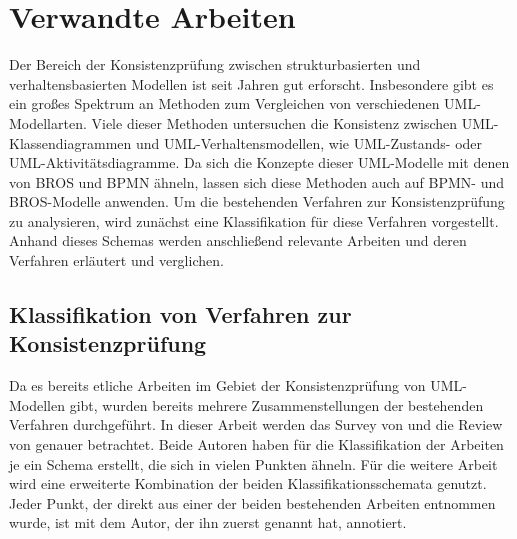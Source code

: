 \chapter{Verwandte Arbeiten}
\label{chap:related_work}

Der Bereich der Konsistenzprüfung zwischen strukturbasierten und verhaltensbasierten Modellen ist seit Jahren gut erforscht.
Insbesondere gibt es ein großes Spektrum an Methoden zum Vergleichen von verschiedenen UML-Modellarten.
Viele dieser Methoden untersuchen die Konsistenz zwischen UML-Klassendiagrammen und UML-Verhaltensmodellen, wie UML-Zustands- oder UML-Aktivitätsdiagramme.
Da sich die Konzepte dieser UML-Modelle mit denen von BROS und BPMN ähneln, lassen sich diese Methoden auch auf BPMN- und BROS-Modelle anwenden.
Um die bestehenden Verfahren zur Konsistenzprüfung zu analysieren, wird zunächst eine Klassifikation für diese Verfahren vorgestellt.
Anhand dieses Schemas werden anschließend relevante Arbeiten und deren Verfahren erläutert und verglichen.

\section{Klassifikation von Verfahren zur Konsistenzprüfung}

Da es bereits etliche Arbeiten im Gebiet der Konsistenzprüfung von UML-Modellen gibt, wurden bereits mehrere Zusammenstellungen der bestehenden Verfahren durchgeführt.
In dieser Arbeit werden das Survey von \cite{Usman2008} und die Review von \cite{Lucas2009} genauer betrachtet.
Beide Autoren haben für die Klassifikation der Arbeiten je ein Schema erstellt, die sich in vielen Punkten ähneln.
Für die weitere Arbeit wird eine erweiterte Kombination der beiden Klassifikationsschemata genutzt.
Jeder Punkt, der direkt aus einer der beiden bestehenden Arbeiten entnommen wurde, ist mit dem Autor, der ihn zuerst genannt hat, annotiert.

